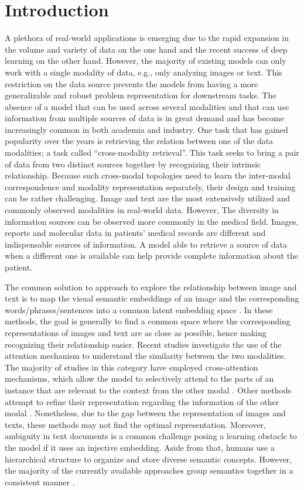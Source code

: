 \documentclass{midl}
\begin{document}
\section{Introduction}
A plethora of real-world applications is emerging due to the rapid expansion in the volume and variety of data on the one hand and the recent success of deep learning on the other hand. However, the majority of existing models can only work with a single modality of data, e.g., only analyzing images or text. This restriction on the data source prevents the models from having a more generalizable and robust problem representation for downstream tasks. The absence of a model that can be used across several modalities and that can use information from multiple sources of data is in great demand and has become increasingly common in both academia and industry. One task that has gained popularity over the years is retrieving the relation between one of the data modalities; a task called ``cross-modality retrieval''. This task seeks to bring a pair of data from two distinct sources together by recognizing their intrinsic relationship. Because such cross-modal topologies need to learn the inter-modal correspondence and modality representation separately, their design and training can be rather challenging. Image and text are the most extensively utilized and commonly observed modalities in real-world data. However, The diversity in information sources can be observed more commonly in the medical field. Images, reports and molecular data in patients' medical records are different and indispensable sources of information. A model able to retrieve a source of data when a different one is available can help provide complete information about the patient.

The common solution to approach to explore the relationship between image and text is to map the visual semantic embeddings \cite{karpathy2015deep,fromedeep} of an image and the corresponding words/phrases/sentences into a common latent embedding space \cite{barnard2003matching,berg2004names,socher2010connecting,chong2009simultaneous}. In these methods, the goal is generally to find a common space where the corresponding representations of images and text are as close as possible, hence making recognizing their relationship easier. Recent studies investigate the use of the attention mechanism to understand the similarity between the two modalities. The majority of studies in this category have employed cross-attention mechanisms, which allow the model to selectively attend to the parts of an instance that are relevant to the context from the other modal \cite{lee2018stacked,huang2017instance}. Other methods attempt to refine their representation regarding the information of the other modal \cite{chen2020imram}.
Nonetheless, due to the gap between the representation of images and texts, these methods may not find the optimal representation. Moreover, ambiguity in text documents is a common challenge posing a learning obstacle to the model if it uses an injective embedding. Aside from that, humans use a hierarchical structure to organize and store diverse semantic concepts. However, the majority of the currently available approaches group semantics together in a consistent manner \cite{lee2018stacked,chen2020imram,song2019polysemous}.
\end{document}
